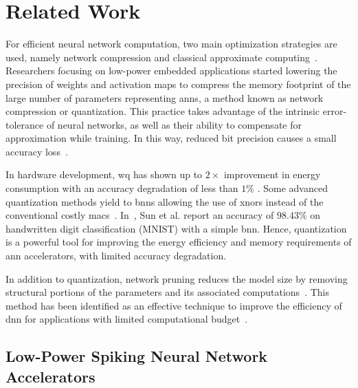 \section{Related Work}
For efficient neural network computation, two main optimization strategies are used, namely network compression and classical approximate computing~\cite{bouvier2019spiking}. Researchers focusing on low-power embedded applications started lowering the precision of weights and activation maps to compress the memory footprint of the large number of parameters representing \glspl{ann}, a method known as network compression or quantization. This practice takes advantage of the intrinsic error-tolerance of neural networks, as well as their ability to compensate for approximation while training. In this way, reduced bit precision causes a small accuracy loss~\cite{courbariaux2015binaryconnect, han2015deep, hubara2017quantized, rastegari2016xnor}.

In hardware development, \gls{wq} has shown up to $2\times$ improvement in energy consumption with an accuracy degradation of less than $1\%$ \cite{moons20160, whatmough201714}. Some advanced quantization methods yield to \glspl{bnn} allowing the use of \glspl{xnor} instead of the conventional costly \glspl{mac}~\cite{rastegari2016xnor}. In~\cite{sun2018xnor}, Sun et al. report an accuracy of $98.43\%$ on handwritten digit classification (MNIST) with a simple \gls{bnn}. Hence, quantization is a powerful tool for improving the energy efficiency and memory requirements of \gls{ann} accelerators, with limited accuracy degradation.

In addition to quantization, network pruning reduces the model size by removing structural portions of the parameters and its associated computations~\cite{lecun1989optimal,hassibi1992second}. This method has been identified as an effective technique to improve the efficiency of \gls{dnn} for applications with limited computational budget~\cite{molchanov2016pruning,li2016pruning, liu2018rethinking}.

\subsection{Low-Power Spiking Neural Network Accelerators}

